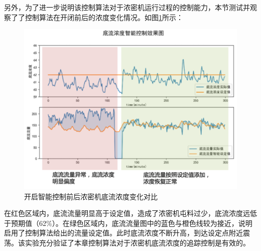 另外，为了进一步说明该控制算法对于浓密机运行过程的控制能力，本节测试并观察了了控制算法在开闭前后的浓度变化情况。如图\ref{fig:actual}所示：

\begin{figure}[htb]
  \centering
  \includegraphics[width=\linewidth,trim=0 0 0 2,clip]{figures/chapter6/actual.png}
  \caption{开启智能控制前后浓密机底流浓度变化对比}
  \label{fig:actual}
\end{figure}
在红色区域内，底流流量明显高于设定值，造成了浓密机屯料过少，底流浓度远低于预期值（62\%）。在绿色区域内，底流流量图中的蓝色与橙色线较为接近，说明启用了控制算法给出的流量设定值。此时底流浓度不断升高，到达设定点附近震荡。该实验充分验证了本章控制算法对于浓密机底流浓度的追踪控制是有效的。












